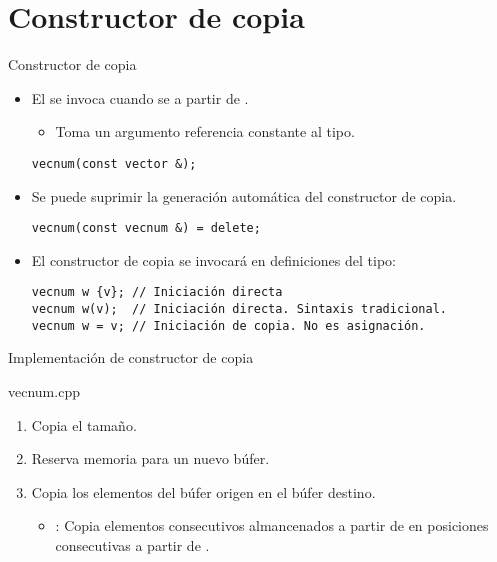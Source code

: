 \section{Constructor de copia}

\begin{frame}[fragile]{Constructor de copia}
\begin{itemize}
  \item El  se invoca cuando se 
         a partir de .
    \begin{itemize}
      \item Toma un argumento referencia constante al tipo.
    \end{itemize}
\begin{lstlisting}
vecnum(const vector &);
\end{lstlisting}

  \item Se puede suprimir la generación automática del constructor de copia.
\begin{lstlisting}
vecnum(const vecnum &) = delete;
\end{lstlisting}

  \item El constructor de copia se invocará en definiciones del tipo:
\begin{lstlisting}
vecnum w {v}; // Iniciación directa
vecnum w(v);  // Iniciación directa. Sintaxis tradicional.
vecnum w = v; // Iniciación de copia. No es asignación.
\end{lstlisting}
\end{itemize}
\end{frame}

\begin{frame}[t]{Implementación de constructor de copia}
\begin{block}{vecnum.cpp}

\end{block}

\begin{enumerate}
  \item Copia el tamaño.
  \item Reserva memoria para un nuevo búfer.
  \item Copia los elementos del búfer origen en el búfer destino.
    \begin{itemize}
      \item {}: Copia  elementos consecutivos almancenados
            a partir de  en posiciones consecutivas a partir de .
    \end{itemize} 
\end{enumerate}
\end{frame}
